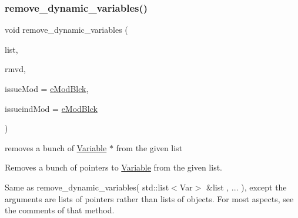 \subsubsection{\texorpdfstring{remove\+\_\+dynamic\+\_\+variables()}{remove\_dynamic\_variables()}\hspace{0.1cm}{\footnotesize\ttfamily [2/2]}}
{\footnotesize\ttfamily void remove\+\_\+dynamic\+\_\+variables (\begin{DoxyParamCaption}\item[{std\+::list$<$ Var $\ast$$>$ \&}]{list,  }\item[{std\+::vector$<$ typename std\+::list$<$ Var $\ast$$>$\+::const\+\_\+iterator $>$ \&}]{rmvd,  }\item[{\mbox{\hyperlink{group___modification___t_y_p_e_s_ga544246d8c462e9a2d817c2c30797968f}{c\+\_\+\+Mod\+Param}}}]{issue\+Mod = {\ttfamily \mbox{\hyperlink{group___modification___t_y_p_e_s_gga48fddcdd03a03f49b7e389ca1ed938d4a21b14b26b1c0093a0905f6fc010bad29}{e\+Mod\+Blck}}},  }\item[{\mbox{\hyperlink{group___modification___t_y_p_e_s_ga544246d8c462e9a2d817c2c30797968f}{c\+\_\+\+Mod\+Param}}}]{issueind\+Mod = {\ttfamily \mbox{\hyperlink{group___modification___t_y_p_e_s_gga48fddcdd03a03f49b7e389ca1ed938d4a21b14b26b1c0093a0905f6fc010bad29}{e\+Mod\+Blck}}} }\end{DoxyParamCaption})}



removes a bunch of \mbox{\hyperlink{class_s_m_spp__di__unipi__it_1_1_variable}{Variable}} $\ast$ from the given list 

Removes a bunch of pointers to \mbox{\hyperlink{class_s_m_spp__di__unipi__it_1_1_variable}{Variable}} from the given list.

Same as remove\+\_\+dynamic\+\_\+variables( std\+::list$<$\+Var$>$ \&list , ... ), except the arguments are lists of pointers rather than lists of objects. For most aspects, see the comments of that method.

